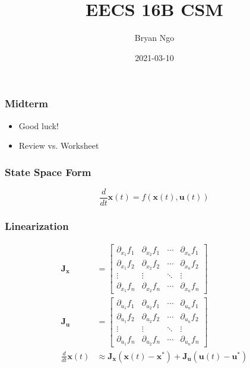 \documentclass[aspectratio=169]{beamer}
\title{EECS 16B CSM}
\author{Bryan Ngo}
\date{2021-03-10}
\institute{UC Berkeley}
\newcommand{\diff}[1]{\frac{d}{d #1}}
\begin{document}
\begin{frame}
    \maketitle
\end{frame}

\begin{frame}
    \frametitle{Midterm}

    \begin{itemize}
        \item Good luck!
        \item Review vs. Worksheet
    \end{itemize}
\end{frame}

\begin{frame}
    \frametitle{State Space Form}

    \begin{equation}
        \diff{t} \bm{x}(t) = f(\bm{x}(t), \bm{u}(t))
    \end{equation}
\end{frame}

\begin{frame}
    \frametitle{Linearization}

    \begin{align}
        \bm{J}_{\bm{x}} &=
        \begin{bmatrix}
            \partial_{x_1} f_1 & \partial_{x_2} f_1 & \cdots & \partial_{x_n} f_1 \\
            \partial_{x_1} f_2 & \partial_{x_2} f_2 & \cdots & \partial_{x_n} f_2 \\
            \vdots & \vdots & \ddots & \vdots \\
            \partial_{x_1} f_n & \partial_{x_2} f_n & \cdots & \partial_{x_n} f_n
        \end{bmatrix} \\
        \bm{J}_{\bm{u}} &=
        \begin{bmatrix}
            \partial_{u_1} f_1 & \partial_{u_2} f_1 & \cdots & \partial_{u_n} f_1 \\
            \partial_{u_1} f_2 & \partial_{u_2} f_2 & \cdots & \partial_{u_n} f_2 \\
            \vdots & \vdots & \ddots & \vdots \\
            \partial_{u_1} f_n & \partial_{u_2} f_n & \cdots & \partial_{u_n} f_n
        \end{bmatrix} \\
        \diff{t} \bm{x}(t) &\approx \bm{J}_{\bm{x}} (\bm{x}(t) - \bm{x}^\ast) + \bm{J}_{\bm{u}} (\bm{u}(t) -\bm{u}^\ast)
    \end{align}
\end{frame}
\end{document}
